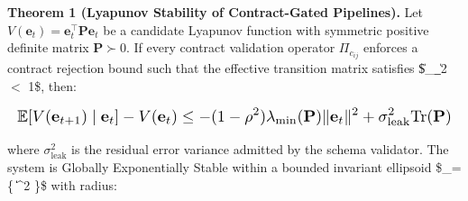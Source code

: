 \documentclass[10pt,journal,compsoc,twocolumn]{IEEEtran}
\begin{document}
\textbf{Theorem 1 (Lyapunov Stability of Contract-Gated Pipelines).} Let $V(\mathbf{e}_t) = \mathbf{e}_t^\top \mathbf{P} \mathbf{e}_t$ be a candidate Lyapunov function with symmetric positive definite matrix $\mathbf{P} \succ 0$. If every contract validation operator $\Pi_{c_{ij}}$ enforces a contract rejection bound such that the effective transition matrix satisfies \$\|\_{}\|\_2 \le \rho $<$ 1\$, then:

























\begin{equation}
\resizebox{\columnwidth}{!}{$\displaystyle
\begin{aligned}
\mathbb{E}[V(\mathbf{e}_{t+1}) \mid \mathbf{e}_t] - V(\mathbf{e}_t) \le -(1 - \rho^2) \lambda_{\min}(\mathbf{P}) \|\mathbf{e}_t\|^2 + \sigma_{\text{leak}}^2 \text{Tr}(\mathbf{P})
\end{aligned}
$}
\end{equation}

























where $\sigma_{\text{leak}}^2$ is the residual error variance admitted by the schema validator. The system is Globally Exponentially Stable within a bounded invariant ellipsoid \$\_\eta = \{ \mid \|\|^2 \le \eta\}\$ with radius:
\end{document}
